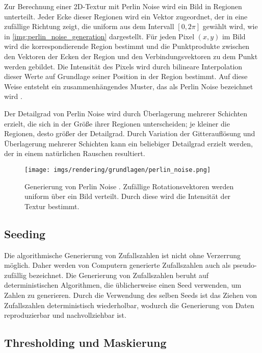 Zur Berechnung einer 2D-Textur mit Perlin Noise wird ein Bild in Regionen unterteilt. Jeder Ecke dieser Regionen wird ein Vektor zugeordnet, der in eine zufällige Richtung zeigt, die uniform aus dem Intervall $[0, 2\pi]$ gewählt wird, wie in \autoref{img:perlin_noise_generation} dargestellt. Für jeden Pixel $(x, y)$ im Bild wird die korrespondierende Region bestimmt und die Punktprodukte zwischen den Vektoren der Ecken der Region und den Verbindungsvektoren zu dem Punkt werden gebildet. Die Intensität des Pixels wird durch bilineare Interpolation dieser Werte auf Grundlage seiner Position in der Region bestimmt. Auf diese Weise entsteht ein zusammenhängendes Muster, das als Perlin Noise bezeichnet wird \cite{perlin_noise_original}.

Der Detailgrad von Perlin Noise wird durch Überlagerung mehrerer Schichten erzielt, die sich in der Größe ihrer Regionen unterscheiden; je kleiner die Regionen, desto größer der Detailgrad. Durch Variation der Gitterauflösung und Überlagerung mehrerer Schichten kann ein beliebiger Detailgrad erzielt werden, der in einem natürlichen Rauschen resultiert.

\begin{figure}
    \centering
    \texttt{[image: imgs/rendering/grundlagen/perlin\_noise.png]}
    \caption{Generierung von Perlin Noise \cite{perlin_noise_img}. Zufällige Rotationsvektoren werden uniform über ein Bild verteilt. Durch diese wird die Intensität der Textur bestimmt.}
    \label{img:perlin_noise_generation}
\end{figure}

\subsection{Seeding}
\label{sec:seeding}

Die algorithmische Generierung von Zufallszahlen ist nicht ohne Verzerrung möglich. Daher werden von Computern generierte Zufallszahlen auch als pseudo-zufällig bezeichnet. Die Generierung von Zufallszahlen beruht auf deterministischen Algorithmen, die üblicherweise einen Seed verwenden, um Zahlen zu generieren. Durch die Verwendung des selben Seeds ist das Ziehen von Zufallszahlen deterministisch wiederholbar, wodurch die Generierung von Daten reproduzierbar und nachvollziehbar ist.

\subsection{Thresholding und Maskierung}
\label{sec:thresholding_maskierung}

